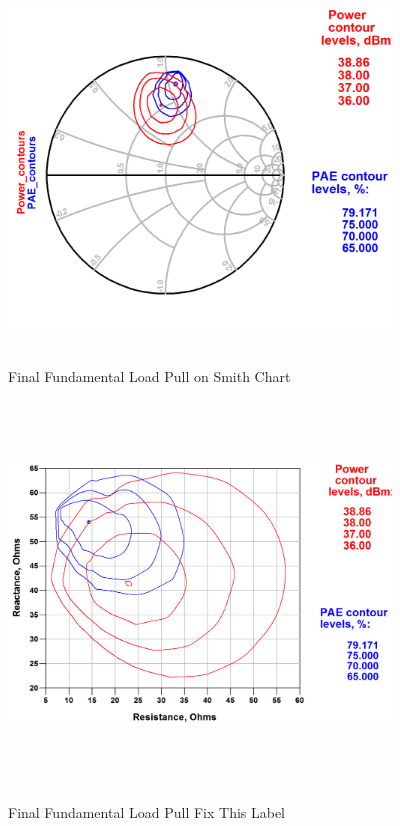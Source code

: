 \begin{figure}
  \centering
  \includegraphics[width=4in,height=4in,keepaspectratio]{figures/simulation/sc_fund_final_load}\\
  \caption{Final Fundamental Load Pull on Smith Chart}
  \label{fig:sc_fund_final_load}

  \vspace*{\floatsep}

  \centering
  \includegraphics[width=4in,height=4in,keepaspectratio]{figures/simulation/res_cont_fund_load_final}\\
  \caption{Final Fundamental Load Pull Fix This Label}
  \label{fig:res_cont_fund_load_final}
\end{figure}

